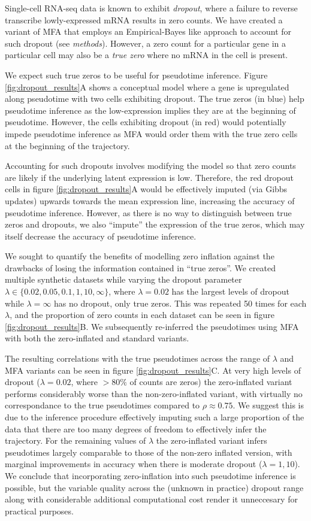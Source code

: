 Single-cell RNA-seq data is known to exhibit \emph{dropout}, where a failure to reverse transcribe lowly-expressed mRNA results in zero counts. We have created a variant of MFA that employs an Empirical-Bayes like approach to account for such dropout (see \emph{methods}). However, a zero count for a particular gene in a particular cell may also be a \emph{true zero} where no mRNA in the cell is present.

We expect such true zeros to be useful for pseudotime inference. Figure \ref{fig:dropout_results}A shows a conceptual model where a gene is upregulated along pseudotime with two cells exhibiting dropout. The true zeros (in blue) help pseudotime inference as the low-expression implies they are at the beginning of pseudotime. However, the cells exhibiting dropout (in red) would potentially impede pseudotime inference as MFA would order them with the true zero cells at the beginning of the trajectory.

Accounting for such dropouts involves modifying the model so that zero counts are likely if the underlying latent expression is low. Therefore, the red dropout cells in figure \ref{fig:dropout_results}A would be effectively imputed (via Gibbs updates) upwards towards the mean expression line, increasing the accuracy of pseudotime inference. However, as there is no way to distinguish between true zeros and dropouts, we also ``impute'' the expression of the true zeros, which may itself decrease the accuracy of pseudotime inference.

We sought to quantify the benefits of modelling zero inflation against the drawbacks of losing the information contained in ``true zeros''. We created multiple synthetic datasets while varying the dropout parameter $\lambda \in \{0.02, 0.05, 0.1, 1, 10, \infty\}$, where $\lambda = 0.02$ has the largest levels of dropout while $\lambda = \infty$ has no dropout, only true zeros. This was repeated 50 times for each $\lambda$, and the proportion of zero counts in each dataset can be seen in figure \ref{fig:dropout_results}B. We subsequently re-inferred the pseudotimes using MFA with both the zero-inflated and standard variants.

The resulting correlations with the true pseudotimes across the range of $\lambda$ and MFA variants can be seen in figure \ref{fig:dropout_results}C. At very high levels of dropout ($\lambda = 0.02$, where $>80\%$ of counts are zeros) the zero-inflated variant performs considerably worse than the non-zero-inflated variant, with virtually no correspondance to the true pseudotimes compared to $\rho \approx 0.75$. We suggest this is due to the inference procedure effectively imputing such a large proportion of the data that there are too many degrees of freedom to effectively infer the trajectory. For the remaining values of $\lambda$ the zero-inflated variant infers pseudotimes largely comparable to those of the non-zero inflated version, with marginal improvements in accuracy when there is moderate dropout ($\lambda = 1, 10$). We conclude that incorporating zero-inflation into such pseudotime inference is possible, but the variable quality across the (unknown in practice) dropout range along with considerable additional computational cost render it unneccesary for practical purposes.

